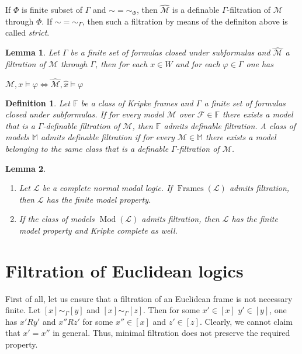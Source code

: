 \documentclass[a4paper]{article}
\theoremstyle{defin}
\newtheorem{defin}{Definition}
\theoremstyle{theorem}
\theoremstyle{prop}
\theoremstyle{lemma}
\newtheorem{lemma}{Lemma}
\theoremstyle{ex}
\theoremstyle{col}
\begin{document}
If $\Phi$ is finite subset of $\Gamma$ and $\sim = \sim_{\Phi}$, then $\widehat{\mathcal{M}}$ is a definable $\Gamma$-filtration of $\mathcal{M}$ through $\Phi$. If $\sim = \sim_{\Gamma}$, then such a filtration by means of the definiton above is called \emph{strict}.

\begin{lemma}
  Let $\Gamma$ be a finite set of formulas closed under subformulas and $\widehat{\mathcal{M}}$ a filtration of $\mathcal{M}$ through $\Gamma$, then for each $x \in W$ and for each $\varphi \in \Gamma$ one has
  \begin{center}
    $\mathcal{M}, x \models \varphi \Leftrightarrow \widehat{\mathcal{M}}, \hat{x} \models \varphi$
  \end{center}
\end{lemma}

\begin{defin} Let $\mathbb{F}$ be a class of Kripke frames and $\Gamma$ a finite set of formulas closed under subformulas. If for every model $\mathcal{M}$ over $\mathcal{F} \in \mathbb{F}$ there exists a model that is a $\Gamma$-definable filtration of $\mathcal{M}$, then $\mathbb{F}$ admits definable filtration. A class of models $\mathbb{M}$ admits definable filtration if for every $\mathcal{M} \in \mathbb{M}$ there exists a model belonging to the same class that is a definable $\Gamma$-filtration of $\mathcal{M}$.
\end{defin}

\begin{lemma}
  $ $

\begin{enumerate}
  \item Let $\mathcal{L}$ be a complete normal modal logic. If $\operatorname{Frames}(\mathcal{L})$ admits filtration, then $\mathcal{L}$ has the finite model property.
  \item If the class of models $\operatorname{Mod}(\mathcal{L})$ admits filtration, then $\mathcal{L}$ has the finite model property and Kripke complete as well.
\end{enumerate}
\end{lemma}

\section{Filtration of Euclidean logics}

First of all, let us ensure that a filtration of an Euclidean frame is not necessary finite.
Let $[x] \sim_{\Gamma} [y]$ and $[x] \sim_{\Gamma} [z]$. Then for some $x' \in [x]$ $y' \in [y]$, one has
$x' R y'$ and $x'' R z'$ for some $x'' \in [x]$ and $z' \in [z]$. Clearly, we cannot claim that $x' = x''$ in general. Thus, minimal filtration does not preserve the required property.
\end{document}
